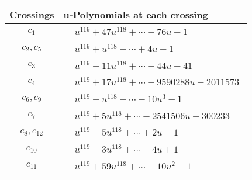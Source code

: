 \documentclass[1p]{elsarticle_modified}
\theoremstyle{definition}
\begin{document}
\begin{tabular}{m{50pt}|m{274pt}}
Crossings & \hspace{64pt}u-Polynomials at each crossing \\
\hline $$\begin{aligned}c_{1}\end{aligned}$$&$\begin{aligned}
&u^{119}+47 u^{118}+\cdots+76 u-1
\end{aligned}$\\
\hline $$\begin{aligned}c_{2},c_{5}\end{aligned}$$&$\begin{aligned}
&u^{119}+u^{118}+\cdots+4 u-1
\end{aligned}$\\
\hline $$\begin{aligned}c_{3}\end{aligned}$$&$\begin{aligned}
&u^{119}-11 u^{118}+\cdots-44 u-41
\end{aligned}$\\
\hline $$\begin{aligned}c_{4}\end{aligned}$$&$\begin{aligned}
&u^{119}+17 u^{118}+\cdots-9590288 u-2011573
\end{aligned}$\\
\hline $$\begin{aligned}c_{6},c_{9}\end{aligned}$$&$\begin{aligned}
&u^{119}- u^{118}+\cdots-10 u^3-1
\end{aligned}$\\
\hline $$\begin{aligned}c_{7}\end{aligned}$$&$\begin{aligned}
&u^{119}+5 u^{118}+\cdots-2541506 u-300233
\end{aligned}$\\
\hline $$\begin{aligned}c_{8},c_{12}\end{aligned}$$&$\begin{aligned}
&u^{119}-5 u^{118}+\cdots+2 u-1
\end{aligned}$\\
\hline $$\begin{aligned}c_{10}\end{aligned}$$&$\begin{aligned}
&u^{119}-3 u^{118}+\cdots-4 u+1
\end{aligned}$\\
\hline $$\begin{aligned}c_{11}\end{aligned}$$&$\begin{aligned}
&u^{119}+59 u^{118}+\cdots-10 u^2-1
\end{aligned}$\\
\hline
\end{tabular}\\~\\
\end{document}
